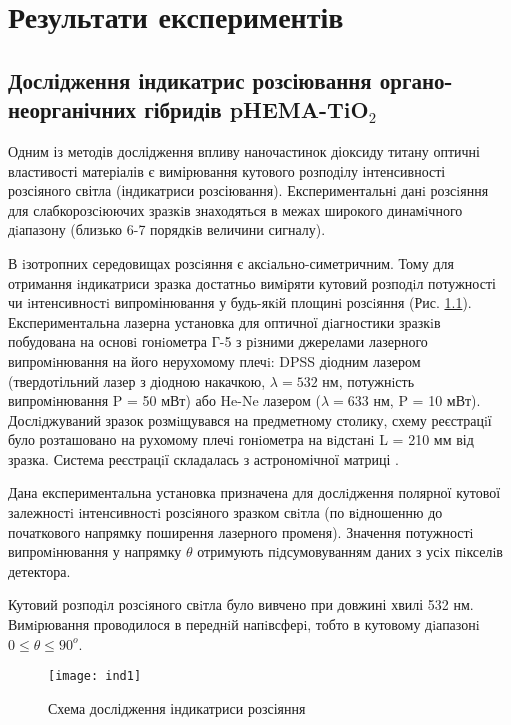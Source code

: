 \newpage
\chapter{Результати експериментів}

\section{Дослідження індикатрис розсіювання органо-неорганічних  гібридів pHEMA-TiO$_2$}
Одним із методів дослідження впливу наночастинок діоксиду титану оптичні властивості матеріалів є вимірювання кутового розподілу інтенсивності розсіяного світла (індикатриси розсіювання).
Експериментальнi данi розсiяння для слабкорозсiюючих зразкiв знаходяться в
межах широкого динамiчного дiапазону (близько 6-7 порядкiв величини сигналу).

В iзотропних середовищах розсiяння є аксiально-симетричним. Тому для
отримання iндикатриси зразка достатньо вимiряти кутовий розподiл потужності чи
iнтенсивностi випромінювання у будь-якiй площинi розсiяння (Рис. \ref{fig:ind1}).
Експериментальна лазерна установка для оптичної дiагностики зразкiв побудована на основi гонiометра
Г-5 з рiзними джерелами лазерного випромiнювання на його нерухомому плечi: DPSS діодним лазером (твердотільний
лазер з діодною накачкою, $\lambda = 532$ нм, потужнiсть випромiнювання P = 50 мВт) або
He-Ne лазером ($\lambda = 633$ нм, P = 10 мВт). Дослiджуваний зразок розмiщувався на
предметному столику, схему реєстрацiї було розташовано на рухомому плечi
гонiометра на вiдстанi L = 210 мм від зразка. Система реєстрацiї складалась з
астрономічної матриці .

Дана експериментальна установка призначена для дослiдження полярної
кутової залежностi iнтенсивностi розсiяного зразком свiтла (по вiдношенню до
початкового напрямку поширення лазерного променя). Значення потужностi
випромiнювання у напрямку $\theta$ отримують пiдсумовуванням даних з усiх пiкселiв
детектора.

Кутовий розподiл розсiяного свiтла було вивчено при довжині хвилі 532 нм.
Вимiрювання проводилося в переднiй напiвсферi, тобто в кутовому дiапазонi
$0 \leq \theta \leq 90^o$.



\begin{figure}
\texttt{[image: ind1]}
\caption{Схема дослідження індикатриси розсіяння}\label{fig:ind1}

\end{figure}


